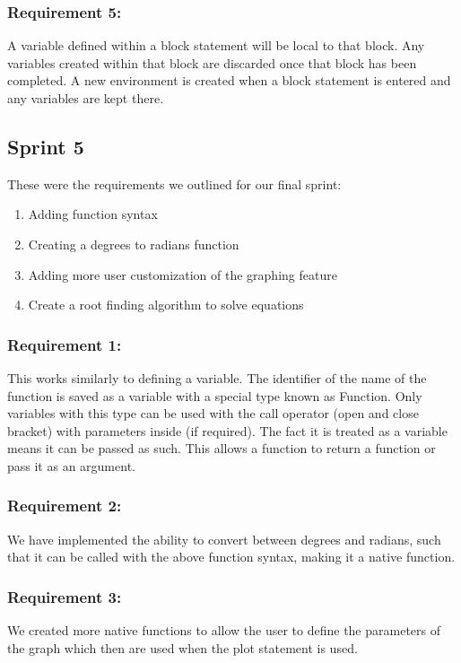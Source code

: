 \documentclass[a4paper, oneside, 11pt]{report}
\begin{document}
\subsubsection{Requirement 5:}
A variable defined within a block statement will be local to that block. Any variables created within that block are discarded once that block has been completed. A new environment is created when a block statement is entered and any variables are kept there.

\subsection{Sprint 5}
These were the requirements we outlined for our final sprint:
\begin{enumerate}
\item Adding function syntax
\item Creating a degrees to radians function
\item Adding more user customization of the graphing feature
\item Create a root finding algorithm to solve equations
\end{enumerate}

\subsubsection{Requirement 1:}
This works similarly to defining a variable. The identifier of the name of the function is saved as a variable with a special type known as Function. Only variables with this type can be used with the call operator (open and close bracket) with parameters inside (if required). The fact it is treated as a variable means it can be passed as such. This allows a function to return a function or pass it as an argument.

\subsubsection{Requirement 2:}
We have implemented the ability to convert between degrees and radians, such that it can be called with the above function syntax, making it a native function.

\subsubsection{Requirement 3:}
We created more native functions to allow the user to define the parameters of the graph which then are used when the plot statement is used.
\end{document}
